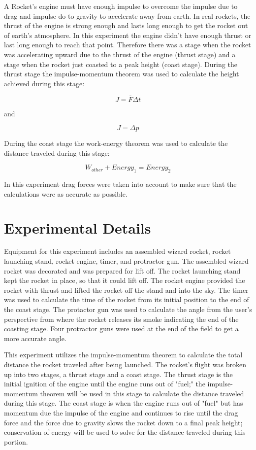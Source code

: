 \documentclass[aps,letterpaper,11pt]{revtex4}
\begin{document}
A Rocket's engine must have enough impulse to overcome the impulse due to drag and impulse do to gravity to accelerate away from earth. In real rockets, the thrust of the engine is strong enough and lasts long enough to get the rocket out of earth's atmosphere. In this experiment the engine didn't have enough thrust or last long enough to reach that point. Therefore there was a stage when the rocket was accelerating upward due to the thrust of the engine (thrust stage) and a stage when the rocket just coasted to a peak height (coast stage). During the thrust stage the impulse-momentum theorem was used to calculate the height achieved during this stage:

$$ J = \bar{F}\Delta t$$ 

and 

$$ J = \Delta p$$

During the coast stage the work-energy theorem was used to calculate the distance traveled during this stage:

$$ W_{other} + Energy_1 = Energy_2$$

In this experiment drag forces were taken into account to make sure that the calculations were as accurate as possible.

\section{Experimental Details}

Equipment for this experiment includes an assembled wizard rocket, rocket launching stand, rocket engine, timer, and protractor gun. The assembled wizard rocket was decorated and was prepared for lift off. The rocket launching stand kept the rocket in place, so that it could lift off. The rocket engine provided the rocket with thrust and lifted the rocket off the stand and into the sky. The timer was used to calculate the time of the rocket from its initial position to the end of the coast stage. The protactor gun was used to calculate the angle from the user's perspective from where the rocket releases its smoke indicating the end of the coasting stage. Four protractor guns were used at the end of the field to get a more accurate angle. 

This experiment utilizes the impulse-momentum theorem to calculate the total distance the rocket traveled after being launched. The rocket's flight was broken up into two stages, a thrust stage and a coast stage. The thrust stage is the initial ignition of the engine until the engine runs out of "fuel;" the impulse-momentum theorem will be used in this stage to calculate the distance traveled during this stage.  The coast stage is when the engine runs out of "fuel" but has momentum due the impulse of the engine and continues to rise until the drag force and the force due to gravity slows the rocket down to a final peak height; conservation of energy will be used to solve for the distance traveled during this portion. 
\end{document}
